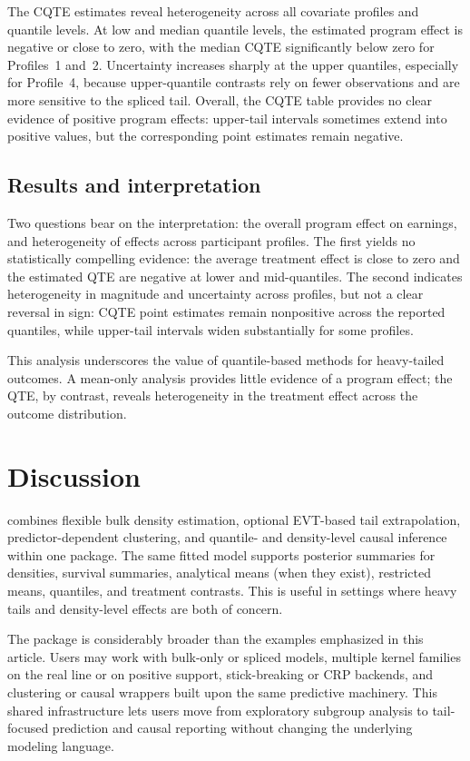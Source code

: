 \documentclass[article]{jss}\usepackage[]{graphicx}\usepackage[]{xcolor}
\begin{document}
The CQTE estimates reveal heterogeneity across all covariate profiles and quantile levels. At low and median quantile levels, the estimated program effect is negative or close to zero, with the median CQTE significantly below zero for Profiles~1 and~2. Uncertainty increases sharply at the upper quantiles, especially for Profile~4, because upper-quantile contrasts rely on fewer observations and are more sensitive to the spliced tail. Overall, the CQTE table provides no clear evidence of positive program effects: upper-tail intervals sometimes extend into positive values, but the corresponding point estimates remain negative.

\subsection{Results and interpretation}

Two questions bear on the interpretation: the overall program effect on earnings, and heterogeneity of effects across participant profiles. The first yields no statistically compelling evidence: the average treatment effect is close to zero and the estimated QTE are negative at lower and mid-quantiles. The second indicates heterogeneity in magnitude and uncertainty across profiles, but not a clear reversal in sign: CQTE point estimates remain nonpositive across the reported quantiles, while upper-tail intervals widen substantially for some profiles.

This analysis underscores the value of quantile-based methods for heavy-tailed outcomes. A mean-only analysis provides little evidence of a program effect; the QTE, by contrast, reveals heterogeneity in the treatment effect across the outcome distribution.

\section{Discussion}
\label{sec:discussion}

 combines flexible bulk density estimation,
optional EVT-based tail extrapolation, predictor-dependent clustering,
and quantile- and density-level causal inference within one package.
The same fitted model supports posterior summaries for densities,
survival summaries, analytical means (when they exist), restricted means,
quantiles, and treatment contrasts. This is useful in settings where
heavy tails and density-level effects are both of concern.

The package is considerably broader than the examples
emphasized in this article.  Users may work with bulk-only or spliced
models, multiple kernel families on the real line or on positive
support, stick-breaking or CRP backends, and clustering or causal
wrappers built upon the same predictive machinery.  This shared
infrastructure lets users move from exploratory subgroup analysis to
tail-focused prediction and causal reporting without changing the
underlying modeling language.
\end{document}
